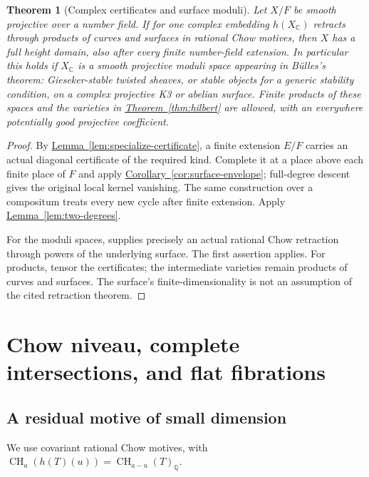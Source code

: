 \documentclass[11pt,a4paper]{article}
\newtheorem{theorem}{Theorem}[section]
\theoremstyle{definition}
\theoremstyle{remark}\newtheorem{remark}[theorem]{Remark}
\numberwithin{equation}{section}
\newcommand{\Q}{\mathbb Q}\newcommand{\R}{\mathbb R}\newcommand{\C}{\mathbb C}
\newcommand{\CH}{\operatorname{CH}}\newcommand{\an}{\mathrm{an}}
\newcommand{\thmref}[1]{\hyperref[#1]{\textcolor{resultlink}{Theorem~\ref*{#1}}}}
\newcommand{\lemref}[1]{\hyperref[#1]{\textcolor{resultlink}{Lemma~\ref*{#1}}}}
\newcommand{\corref}[1]{\hyperref[#1]{\textcolor{resultlink}{Corollary~\ref*{#1}}}}
\begin{document}
\begin{theorem}[Complex certificates and surface moduli]\label{thm:moduli}
Let $X/F$ be smooth projective over a number field. If for one complex
embedding $h(X_\C)$ retracts through products of curves and surfaces
in rational Chow motives, then $X$ has a full height domain, also
after every finite number-field extension. In particular this holds
if $X_\C$ is a smooth projective moduli space appearing in
B\"ulles's theorem: Gieseker-stable twisted sheaves, or stable objects
for a generic stability condition, on a complex projective K3 or
abelian surface. Finite products of these spaces and the varieties
in \thmref{thm:hilbert} are allowed, with an everywhere potentially
good projective coefficient.
\end{theorem}

\begin{proof}
By \lemref{lem:specialize-certificate}, a finite extension $E/F$
carries an actual diagonal certificate of the required kind.
Complete it at a place above each finite place of $F$ and apply
\corref{cor:surface-envelope}; full-degree descent gives the
original local kernel vanishing. The same construction over a
compositum treats every new cycle after finite extension. Apply
\lemref{lem:two-degrees}.

For the moduli spaces, \cite[Theorem 0.1]{Bulles} supplies precisely
an actual rational Chow retraction through powers of the underlying
surface. The first assertion applies. For products, tensor the
certificates; the intermediate varieties remain products of curves
and surfaces. The surface's finite-dimensionality is not an
assumption of the cited retraction theorem.
\end{proof}



\section{Chow niveau, complete intersections, and flat fibrations}\label{sec:niveau}

\subsection{A residual motive of small dimension}

We use covariant rational Chow motives, with
$\CH_a(h(T)(u))=\CH_{a-u}(T)_\Q$.
\end{document}
